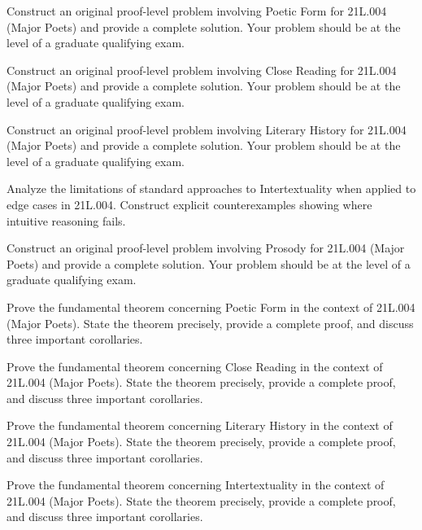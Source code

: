 \documentclass[12pt,a4paper]{exam}
\begin{document}
\begin{questions}
\vspace{0.3cm}

\question[3]
Construct an original proof-level problem involving Poetic Form for 21L.004 (Major Poets) and provide a complete solution. Your problem should be at the level of a graduate qualifying exam.

\vspace{0.3cm}

\question[6]
Construct an original proof-level problem involving Close Reading for 21L.004 (Major Poets) and provide a complete solution. Your problem should be at the level of a graduate qualifying exam.

\vspace{0.3cm}

\question[5]
Construct an original proof-level problem involving Literary History for 21L.004 (Major Poets) and provide a complete solution. Your problem should be at the level of a graduate qualifying exam.

\vspace{0.3cm}

\question[5]
Analyze the limitations of standard approaches to Intertextuality when applied to edge cases in 21L.004. Construct explicit counterexamples showing where intuitive reasoning fails.

\vspace{0.3cm}

\question[5]
Construct an original proof-level problem involving Prosody for 21L.004 (Major Poets) and provide a complete solution. Your problem should be at the level of a graduate qualifying exam.

\vspace{0.3cm}

\question[3]
Prove the fundamental theorem concerning Poetic Form in the context of 21L.004 (Major Poets). State the theorem precisely, provide a complete proof, and discuss three important corollaries.

\vspace{0.3cm}

\question[5]
Prove the fundamental theorem concerning Close Reading in the context of 21L.004 (Major Poets). State the theorem precisely, provide a complete proof, and discuss three important corollaries.

\vspace{0.3cm}

\question[4]
Prove the fundamental theorem concerning Literary History in the context of 21L.004 (Major Poets). State the theorem precisely, provide a complete proof, and discuss three important corollaries.

\vspace{0.3cm}

\question[3]
Prove the fundamental theorem concerning Intertextuality in the context of 21L.004 (Major Poets). State the theorem precisely, provide a complete proof, and discuss three important corollaries.

\vspace{0.3cm}

\end{questions}
\end{document}
